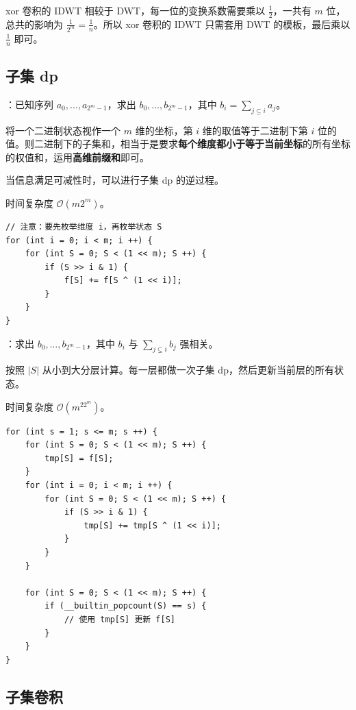 xor 卷积的 IDWT 相较于 DWT，每一位的变换系数需要乘以 $\frac{1}{2}$，一共有 $m$ 位，总共的影响为 $\frac{1}{2^m} = \frac{1}{n}$。所以 xor 卷积的 IDWT 只需套用 DWT 的模板，最后乘以 $\frac{1}{n}$ 即可。


\subsection{子集 dp}

：已知序列 $a_0, \dots, a_{2^m - 1}$，求出 $b_0, \dots, b_{2^m - 1}$，其中 $b_i = \sum_{j \subseteq i} a_j$。

将一个二进制状态视作一个 $m$ 维的坐标，第 $i$ 维的取值等于二进制下第 $i$ 位的值。则二进制下的子集和，相当于是要求\textbf{每个维度都小于等于当前坐标}的所有坐标的权值和，运用\textbf{高维前缀和}即可。

当信息满足可减性时，可以进行子集 dp 的逆过程。

时间复杂度 $\mathcal{O}(m2^m)$。

\begin{verbatim}
// 注意：要先枚举维度 i，再枚举状态 S
for (int i = 0; i < m; i ++) {
    for (int S = 0; S < (1 << m); S ++) {
        if (S >> i & 1) {
            f[S] += f[S ^ (1 << i)];
        }
    }
}
\end{verbatim}

：求出 $b_0, \dots, b_{2^m - 1}$，其中 $b_i$ 与 $\sum_{j \subsetneq i} b_j$ 强相关。

按照 $|S|$ 从小到大分层计算。每一层都做一次子集 dp，然后更新当前层的所有状态。

时间复杂度 $\mathcal{O}(m^22^m)$。

\begin{verbatim}
for (int s = 1; s <= m; s ++) {
    for (int S = 0; S < (1 << m); S ++) {
        tmp[S] = f[S];
    }
    for (int i = 0; i < m; i ++) {
        for (int S = 0; S < (1 << m); S ++) {
            if (S >> i & 1) {
                tmp[S] += tmp[S ^ (1 << i)];
            }
        }
    }
    
    for (int S = 0; S < (1 << m); S ++) {
        if (__builtin_popcount(S) == s) {
            // 使用 tmp[S] 更新 f[S]
        }
    }
}
\end{verbatim}

\subsection{子集卷积}


